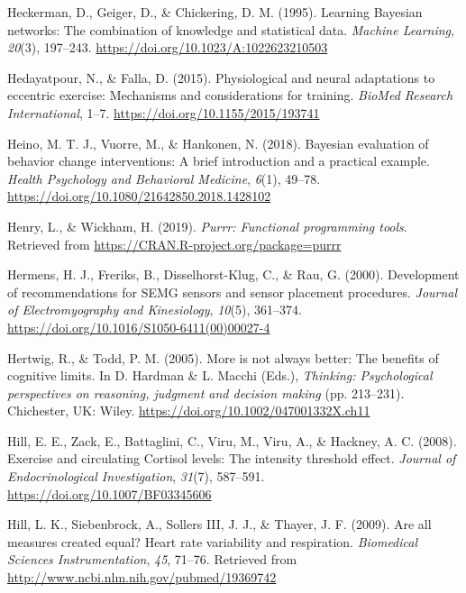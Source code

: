\documentclass[
  english,
  man,floatsintext]{apa6}
\begin{document}
\leavevmode\hypertarget{ref-Heckerman1995}{}%
Heckerman, D., Geiger, D., \& Chickering, D. M. (1995). Learning Bayesian networks: The combination of knowledge and statistical data. \emph{Machine Learning}, \emph{20}(3), 197--243. \url{https://doi.org/10.1023/A:1022623210503}

\leavevmode\hypertarget{ref-Hedayatpour2015}{}%
Hedayatpour, N., \& Falla, D. (2015). Physiological and neural adaptations to eccentric exercise: Mechanisms and considerations for training. \emph{BioMed Research International}, 1--7. \url{https://doi.org/10.1155/2015/193741}

\leavevmode\hypertarget{ref-Heino2018}{}%
Heino, M. T. J., Vuorre, M., \& Hankonen, N. (2018). Bayesian evaluation of behavior change interventions: A brief introduction and a practical example. \emph{Health Psychology and Behavioral Medicine}, \emph{6}(1), 49--78. \url{https://doi.org/10.1080/21642850.2018.1428102}

\leavevmode\hypertarget{ref-R-purrr}{}%
Henry, L., \& Wickham, H. (2019). \emph{Purrr: Functional programming tools}. Retrieved from \url{https://CRAN.R-project.org/package=purrr}

\leavevmode\hypertarget{ref-Hermens2000}{}%
Hermens, H. J., Freriks, B., Disselhorst-Klug, C., \& Rau, G. (2000). Development of recommendations for SEMG sensors and sensor placement procedures. \emph{Journal of Electromyography and Kinesiology}, \emph{10}(5), 361--374. \url{https://doi.org/10.1016/S1050-6411(00)00027-4}

\leavevmode\hypertarget{ref-Hertwig2005}{}%
Hertwig, R., \& Todd, P. M. (2005). More is not always better: The benefits of cognitive limits. In D. Hardman \& L. Macchi (Eds.), \emph{Thinking: Psychological perspectives on reasoning, judgment and decision making} (pp. 213--231). Chichester, UK: Wiley. \url{https://doi.org/10.1002/047001332X.ch11}

\leavevmode\hypertarget{ref-Hill2008}{}%
Hill, E. E., Zack, E., Battaglini, C., Viru, M., Viru, A., \& Hackney, A. C. (2008). Exercise and circulating Cortisol levels: The intensity threshold effect. \emph{Journal of Endocrinological Investigation}, \emph{31}(7), 587--591. \url{https://doi.org/10.1007/BF03345606}

\leavevmode\hypertarget{ref-Hill2009}{}%
Hill, L. K., Siebenbrock, A., Sollers III, J. J., \& Thayer, J. F. (2009). Are all measures created equal? Heart rate variability and respiration. \emph{Biomedical Sciences Instrumentation}, \emph{45}, 71--76. Retrieved from \url{http://www.ncbi.nlm.nih.gov/pubmed/19369742}
\end{document}
